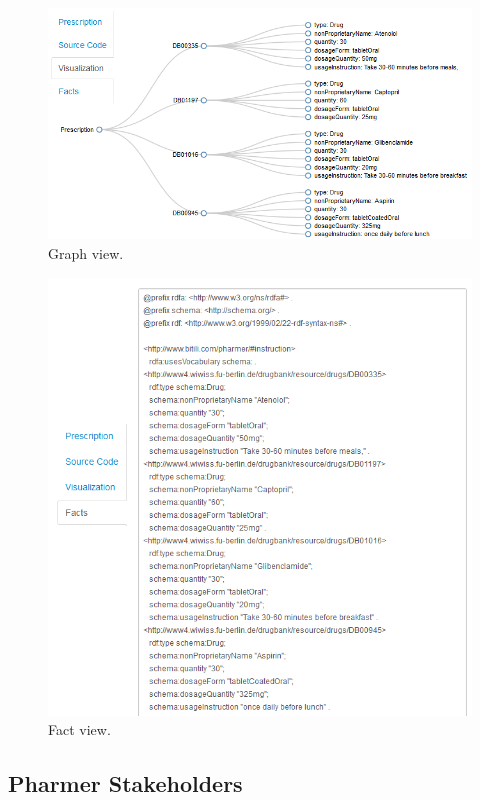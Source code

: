 \documentclass[conference]{IEEEtran}
\begin{document}
\begin{figure}[tb]
	\centering
		\includegraphics[width=1\columnwidth]{../images/sc2.png}
	\caption{Graph view.}
	\label{fig:graphview}
\end{figure}

\begin{figure}[tb]
	\centering
		\includegraphics[width=1\columnwidth]{../images/sc4.png}
	\caption{Fact view.}
	\label{fig:factview}
\end{figure}

\subsection{Pharmer Stakeholders}
\label{sec:stake}
\end{document}
